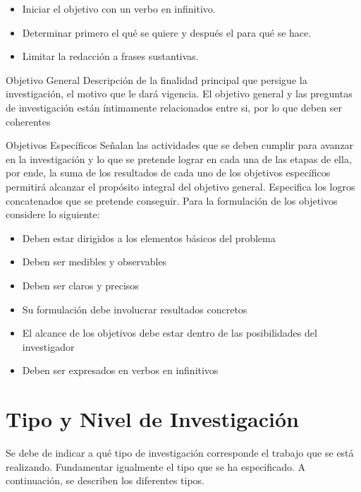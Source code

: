 \begin{itemize}
    \item Iniciar el objetivo con un verbo en infinitivo.
    \item Determinar primero el qué se quiere y después el para qué se hace.
    \item Limitar la redacción a frases sustantivas.
\end{itemize}

\begin{subseccion}{Objetivo General}
Descripción de la finalidad principal que persigue la investigación, el motivo que le dará vigencia. El objetivo general y las preguntas de investigación están íntimamente relacionados entre si, por lo que deben ser coherentes
\end{subseccion}

\begin{subseccion}{Objetivos Específicos}
Señalan las actividades que se deben cumplir para avanzar en la investigación y lo que se pretende lograr en cada una de las etapas de ella, por ende, la suma de los resultados de cada uno de los objetivos específicos permitirá alcanzar el propósito integral del objetivo general. Especifica los logros concatenados que se pretende conseguir.
Para la formulación de los objetivos considere lo siguiente:

\begin{itemize}
    \item Deben estar dirigidos a los elementos básicos del problema
    \item Deben ser medibles y observables
    \item Deben ser claros y precisos
    \item Su formulación debe involucrar resultados concretos
    \item El alcance de los objetivos debe estar dentro de las posibilidades del investigador
    \item Deben ser expresados en verbos en infinitivos
\end{itemize}
\end{subseccion}

\section{Tipo y Nivel de Investigación}
Se debe de indicar a qué tipo de investigación corresponde el trabajo que se está realizando. Fundamentar igualmente el tipo que se ha especificado. A continuación, se describen los diferentes tipos.\newline 

